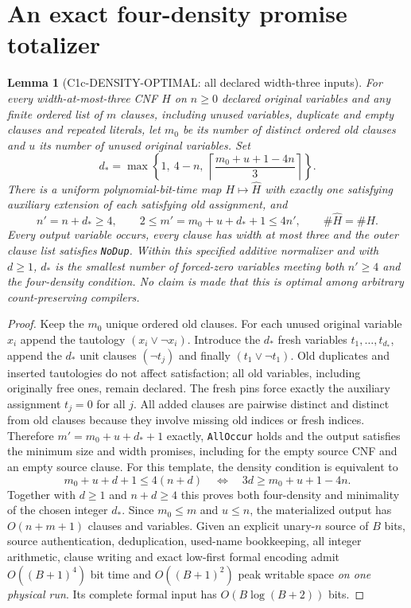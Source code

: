 \documentclass[11pt]{article}
\newtheorem{lemma}{Lemma}
\begin{document}
\section{An exact four-density promise totalizer}
\begin{lemma}[C1c-DENSITY-OPTIMAL: all declared width-three inputs]
For every width-at-most-three CNF $H$ on $n\ge0$ declared original
variables and any finite ordered list of $m$ clauses, including unused
variables, duplicate and empty clauses and repeated literals,
let $m_0$ be its number of \emph{distinct ordered} old clauses and
$u$ its number of unused original variables. Set
\[
d_*=\max\left\{1,\ 4-n,\
\left\lceil\frac{m_0+u+1-4n}{3}\right\rceil\right\}.
\]
There is a uniform polynomial-bit-time map $H\mapsto\widehat H$
with exactly one satisfying auxiliary extension of each satisfying
old assignment, and
\[
n'=n+d_*\ge4,\qquad
2\le m'=m_0+u+d_*+1\le4n',\qquad
\#\widehat H=\#H.
\]
Every output variable occurs, every clause has width at most three
and the outer clause list satisfies \texttt{NoDup}.
Within \emph{this specified additive normalizer} and with $d\ge1$,
$d_*$ is the smallest number of forced-zero variables meeting
both $n'\ge4$ and the four-density condition. No claim is made
that this is optimal among arbitrary count-preserving compilers.
\end{lemma}
\begin{proof}
Keep the $m_0$ unique ordered old clauses. For each unused original
variable $x_i$ append the tautology $(x_i\lor\neg x_i)$.
Introduce the $d_*$ fresh variables $t_1,\ldots,t_{d_*}$,
append the $d_*$ unit clauses $(\neg t_j)$ and finally
$(t_1\lor\neg t_1)$. Old duplicates and inserted tautologies
do not affect satisfaction; all old variables, including originally
free ones, remain declared. The fresh pins force exactly the
auxiliary assignment $t_j=0$ for all $j$. All added clauses
are pairwise distinct and distinct from old clauses because
they involve missing old indices or fresh indices. Therefore
$m'=m_0+u+d_*+1$ exactly, \texttt{AllOccur} holds and
the output satisfies the minimum size and width promises,
including for the empty source CNF and an empty source clause.
For this template, the density condition is equivalent to
\[
m_0+u+d+1\le4(n+d)
\quad\Longleftrightarrow\quad
3d\ge m_0+u+1-4n.
\]
Together with $d\ge1$ and $n+d\ge4$ this proves both
four-density and minimality of the chosen integer $d_*$.
Since $m_0\le m$ and $u\le n$, the materialized output has
$O(n+m+1)$ clauses and variables. Given an explicit unary-$n$
source of $B$ bits, source authentication, deduplication, used-name
bookkeeping, all integer arithmetic, clause writing and exact
low-first formal encoding admit $O((B+1)^4)$ bit time and
$O((B+1)^2)$ peak writable space \emph{on one physical run}.
Its complete formal input has $O(B\log(B+2))$ bits.
\end{proof}
\end{document}
